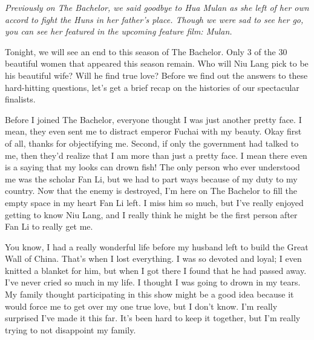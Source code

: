 \documentclass[letterpaper,12pt]{memoir}
\begin{document}
\begin{dramatis}
\end{dramatis}


\scene{}

\textit{Previously on The Bachelor, we said goodbye to Hua Mulan as she left of her own accord to fight the Huns in her father's place. Though we were sad to see her go, you can see her featured in the upcoming feature film: Mulan.}

\host%
Tonight, we will see an end to this season of The Bachelor. Only 3 of the 30 beautiful women that appeared this season remain. Who will Niu Lang pick to be his beautiful wife? Will he find true love? Before we find out the answers to these hard-hitting questions, let's get a brief recap on the histories of our spectacular finalists.

\xishi%
Before I joined The Bachelor, everyone thought I was just another pretty face. I mean, they even sent me to distract emperor Fuchai with my beauty. Okay first of all, thanks for objectifying me. Second, if only the government had talked to me, then they'd realize that I am more than just a pretty face. I mean there even is a saying that my looks can drown fish! The only person who ever understood me was the scholar Fan Li, but we had to part ways because of my duty to my country. Now that the enemy is destroyed, I'm here on The Bachelor to fill the empty space in my heart Fan Li left. I miss him so much, but I've really enjoyed getting to know Niu Lang, and I really think he might be the first person after Fan Li to really get me.

\mengjiangnu%
You know, I had a really wonderful life before my husband left to build the Great Wall of China. That's when I lost everything. I was so devoted and loyal; I even knitted a blanket for him, but when I got there I found that he had passed away. I've never cried so much in my life. I thought I was going to drown in my tears. My family thought participating in this show might be a good idea because it would force me to get over my one true love, but I don't know. I'm really surprised I've made it this far. It's been hard to keep it together, but I'm really trying to not disappoint my family.
\end{document}
